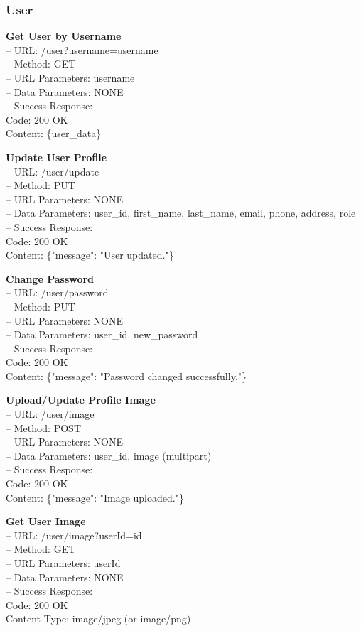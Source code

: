 \subsubsection*{User}
\textbf{Get User by Username} \\
– URL: /user?username={username} \\
– Method: GET \\
– URL Parameters: username \\
– Data Parameters: NONE \\
– Success Response: \\
Code: 200 OK \\
Content: \{user\_data\}

\textbf{Update User Profile} \\
– URL: /user/update \\
– Method: PUT \\
– URL Parameters: NONE \\
– Data Parameters: user\_id, first\_name, last\_name, email, phone, address, role \\
– Success Response: \\
Code: 200 OK \\
Content: \{"message": "User updated."\}

\textbf{Change Password} \\
– URL: /user/password \\
– Method: PUT \\
– URL Parameters: NONE \\
– Data Parameters: user\_id, new\_password \\
– Success Response: \\
Code: 200 OK \\
Content: \{"message": "Password changed successfully."\}

\textbf{Upload/Update Profile Image} \\
– URL: /user/image \\
– Method: POST \\
– URL Parameters: NONE \\
– Data Parameters: user\_id, image (multipart) \\
– Success Response: \\
Code: 200 OK \\
Content: \{"message": "Image uploaded."\}

\textbf{Get User Image} \\
– URL: /user/image?userId={id} \\
– Method: GET \\
– URL Parameters: userId \\
– Data Parameters: NONE \\
– Success Response: \\
Code: 200 OK \\
Content-Type: image/jpeg (or image/png)